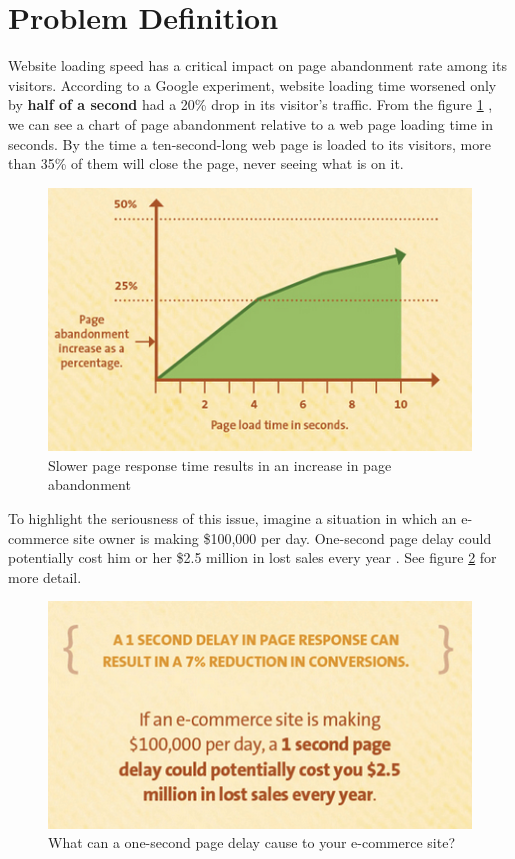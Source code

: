 \section{Problem Definition}

Website loading speed has a critical impact on page abandonment rate among its visitors. According to a Google experiment, website loading time worsened only by \textbf{half of a second} had a 20\% drop in its visitor’s traffic. \cite{KISSmetrics:Speed-Google} From the figure \ref{fig:kissmetrics-page-abandonment} \cite{Fig:Kissmetrics-page-abandonment}, we can see a chart of page abandonment relative to a web page loading time in seconds. By the time a ten-second-long web page is loaded to its visitors, more than 35\% of them will close the page, never seeing what is on it.

\begin{figure}[H]
\begin{center}
\includegraphics[scale=0.5]{figures/page-abandonment-chart.png}
\caption{Slower page response time results in an increase in page abandonment}
\label{fig:kissmetrics-page-abandonment}
\end{center}
\end{figure}

To highlight the seriousness of this issue, imagine a situation in which an e-commerce site owner is making \$100,000 per day. One-second page delay could potentially cost him or her \$2.5 million in lost sales every year \cite{Fig:Kissmetrics-page-abandonment}. See figure \ref{fig:kissmetrics-eshop-delay} for more detail.

\begin{figure}[H]
\begin{center}
\includegraphics[scale=0.5]{figures/kissmetrics-eshop-delay.png}
\caption{What can a one-second page delay cause to your e-commerce site?}
\label{fig:kissmetrics-eshop-delay}
\end{center}
\end{figure}

